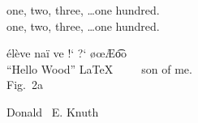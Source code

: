 \documentclass[11pt,oneside,a4paper]{article}
\begin{document}
            one, two, three, \dots one hundred.\\
            one, two, three, \ldots one hundred.

            \'el\`eve na\"i ve !` ?` \o \oe \AE \t{oo} \textregistered \texttrademark\\

            ``Hello Wood'' \LaTeX \ \ \ \ \ son of me. \\


            Fig.~2a \par
            Donald ~E. Knuth \par
\end{document}
